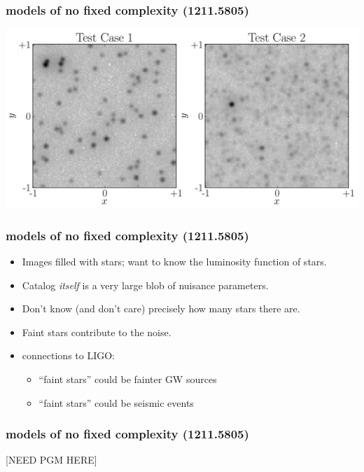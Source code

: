 \documentclass[pdftex]{beamer}
\begin{document}
\begin{frame}
\begin{itemize}
 \end{itemize}
\end{frame}

\begin{frame}
  \frametitle{models of no fixed complexity {\small (1211.5805)}}
  \includegraphics[width=\textwidth]{test_cases_copy.pdf}
\end{frame}

\begin{frame}
  \frametitle{models of no fixed complexity {\small (1211.5805)}}
  \begin{itemize}
  \item Images filled with stars; want to know the luminosity function of stars.
  \item Catalog \emph{itself} is a very large blob of nuisance parameters.
  \item Don't know (and don't care) precisely how many stars there are.
  \item Faint stars contribute to the noise.
  \item connections to LIGO:
    \begin{itemize}
    \item ``faint stars'' could be fainter GW sources
    \item ``faint stars'' could be seismic events
    \end{itemize}
  \end{itemize}
\end{frame}

\begin{frame}
  \frametitle{models of no fixed complexity {\small (1211.5805)}}
  [NEED PGM HERE]
\end{frame}
\end{document}
